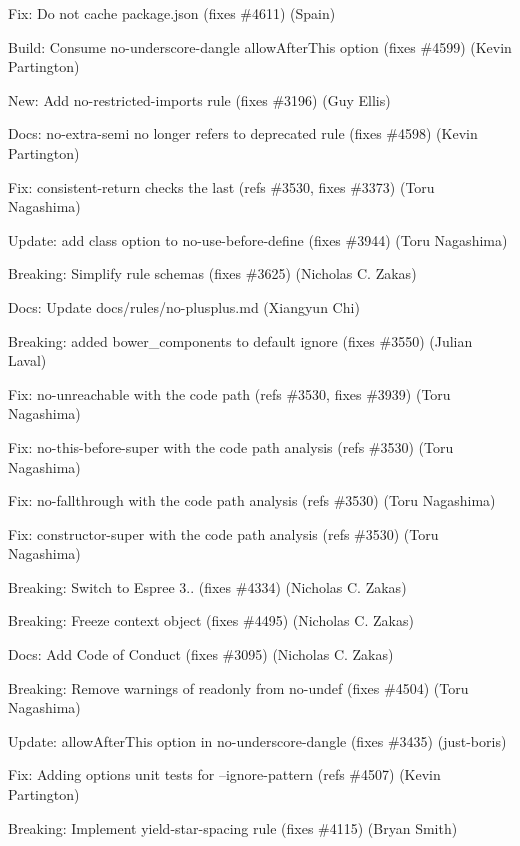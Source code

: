 \begin{DoxyItemize}
\item Fix\+: Do not cache {\ttfamily package.\+json} (fixes \#4611) (Spain)
\item Build\+: Consume no-\/underscore-\/dangle allow\+After\+This option (fixes \#4599) (Kevin Partington)
\item New\+: Add no-\/restricted-\/imports rule (fixes \#3196) (Guy Ellis)
\item Docs\+: no-\/extra-\/semi no longer refers to deprecated rule (fixes \#4598) (Kevin Partington)
\item Fix\+: {\ttfamily consistent-\/return} checks the last (refs \#3530, fixes \#3373) (Toru Nagashima)
\item Update\+: add class option to {\ttfamily no-\/use-\/before-\/define} (fixes \#3944) (Toru Nagashima)
\item Breaking\+: Simplify rule schemas (fixes \#3625) (Nicholas C. Zakas)
\item Docs\+: Update docs/rules/no-\/plusplus.\+md (Xiangyun Chi)
\item Breaking\+: added bower\+\_\+components to default ignore (fixes \#3550) (Julian Laval)
\item Fix\+: {\ttfamily no-\/unreachable} with the code path (refs \#3530, fixes \#3939) (Toru Nagashima)
\item Fix\+: {\ttfamily no-\/this-\/before-\/super} with the code path analysis (refs \#3530) (Toru Nagashima)
\item Fix\+: {\ttfamily no-\/fallthrough} with the code path analysis (refs \#3530) (Toru Nagashima)
\item Fix\+: {\ttfamily constructor-\/super} with the code path analysis (refs \#3530) (Toru Nagashima)
\item Breaking\+: Switch to Espree 3.. (fixes \#4334) (Nicholas C. Zakas)
\item Breaking\+: Freeze context object (fixes \#4495) (Nicholas C. Zakas)
\item Docs\+: Add Code of Conduct (fixes \#3095) (Nicholas C. Zakas)
\item Breaking\+: Remove warnings of readonly from {\ttfamily no-\/undef} (fixes \#4504) (Toru Nagashima)
\item Update\+: allow\+After\+This option in no-\/underscore-\/dangle (fixes \#3435) (just-\/boris)
\item Fix\+: Adding options unit tests for --ignore-\/pattern (refs \#4507) (Kevin Partington)
\item Breaking\+: Implement yield-\/star-\/spacing rule (fixes \#4115) (Bryan Smith)

\end{DoxyItemize}
